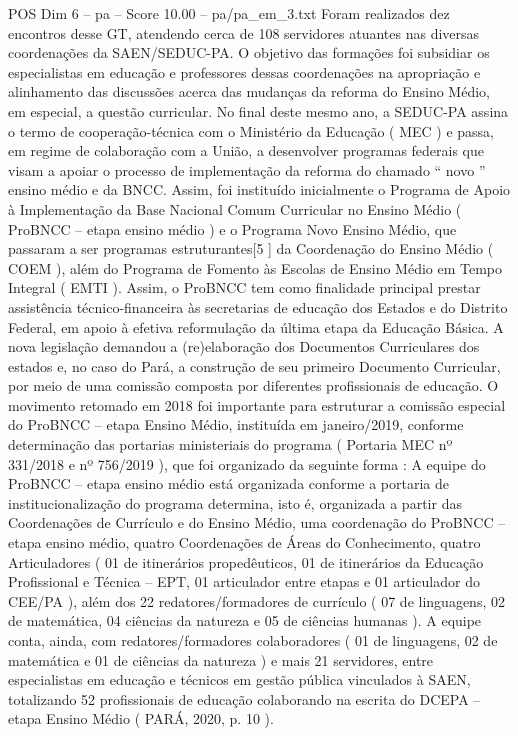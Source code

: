 \begin{textsample}{POS Dim 6 – pa – Score 10.00 – pa/pa\_em\_3.txt}
Foram realizados dez encontros desse GT, atendendo cerca de 108 servidores atuantes nas diversas coordenações da SAEN/SEDUC-PA.
O objetivo das formações foi subsidiar os especialistas em educação e professores dessas coordenações na apropriação e alinhamento das discussões acerca das mudanças da reforma do Ensino Médio, em especial, a questão curricular.
No final deste mesmo ano, a SEDUC-PA assina o termo de cooperação-técnica com o Ministério da Educação ( MEC ) e passa, em regime de colaboração com a União, a desenvolver programas federais que visam a apoiar o processo de implementação da reforma do chamado “ novo ” ensino médio e da BNCC.
Assim, foi instituído inicialmente o Programa de Apoio à Implementação da Base Nacional Comum Curricular no Ensino Médio ( ProBNCC – etapa ensino médio ) e o Programa Novo Ensino Médio, que passaram a ser programas estruturantes[5 ] da Coordenação do Ensino Médio ( COEM ), além do Programa de Fomento às Escolas de Ensino Médio em Tempo Integral ( EMTI ).
Assim, o ProBNCC tem como finalidade principal prestar assistência técnico-financeira às secretarias de educação dos Estados e do Distrito Federal, em apoio à efetiva reformulação da última etapa da Educação Básica.
A nova legislação demandou a (re)elaboração dos Documentos Curriculares dos estados e, no caso do Pará, a construção de seu primeiro Documento Curricular, por meio de uma comissão composta por diferentes profissionais de educação.
O movimento retomado em 2018 foi importante para estruturar a comissão especial do ProBNCC – etapa Ensino Médio, instituída em janeiro/2019, conforme determinação das portarias ministeriais do programa ( Portaria MEC nº 331/2018 e nº 756/2019 ), que foi organizado da seguinte forma : A equipe do ProBNCC – etapa ensino médio está organizada conforme a portaria de institucionalização do programa determina, isto é, organizada a partir das Coordenações de Currículo e do Ensino Médio, uma coordenação do ProBNCC – etapa ensino médio, quatro Coordenações de Áreas do Conhecimento, quatro Articuladores ( 01 de itinerários propedêuticos, 01 de itinerários da Educação Profissional e Técnica – EPT, 01 articulador entre etapas e 01 articulador do CEE/PA ), além dos 22 redatores/formadores de currículo ( 07 de linguagens, 02 de matemática, 04 ciências da natureza e 05 de ciências humanas ).
A equipe conta, ainda, com redatores/formadores colaboradores ( 01 de linguagens, 02 de matemática e 01 de ciências da natureza ) e mais 21 servidores, entre especialistas em educação e técnicos em gestão pública vinculados à SAEN, totalizando 52 profissionais de educação colaborando na escrita do DCEPA – etapa Ensino Médio ( PARÁ, 2020, p. 10 ).

\end{textsample}
